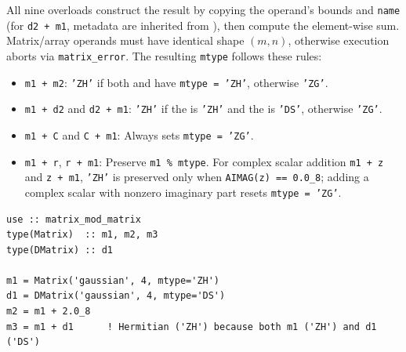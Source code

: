 All nine overloads construct the result by copying the  operand's bounds and \texttt{name} (for \texttt{d2 + m1}, metadata are inherited from ), then compute the element-wise sum. Matrix/array operands must have identical shape $(m, n)$, otherwise execution aborts via \texttt{matrix\_error}. The resulting \texttt{mtype} follows these rules:
\begin{itemize}
  \item \texttt{m1 + m2}: \texttt{'ZH'} if both  and  have \texttt{mtype = 'ZH'}, otherwise \texttt{'ZG'}.
  \item \texttt{m1 + d2} and \texttt{d2 + m1}: \texttt{'ZH'} if the  is \texttt{'ZH'} and the  is \texttt{'DS'}, otherwise \texttt{'ZG'}.
  \item \texttt{m1 + C} and \texttt{C + m1}: Always sets \texttt{mtype = 'ZG'}.
  \item \texttt{m1 + r}, \texttt{r + m1}: Preserve \texttt{m1 \% mtype}. For complex scalar addition \texttt{m1 + z} and \texttt{z + m1}, \texttt{'ZH'} is preserved only when \texttt{AIMAG(z) == 0.0\_8}; adding a complex scalar with nonzero imaginary part resets \texttt{mtype = 'ZG'}.
\end{itemize}

\begin{description}[leftmargin=2.2cm, style=nextline]
\end{description}

\lstset{language=[95]Fortran}
\begin{lstlisting}
use :: matrix_mod_matrix
type(Matrix)  :: m1, m2, m3
type(DMatrix) :: d1

m1 = Matrix('gaussian', 4, mtype='ZH')
d1 = DMatrix('gaussian', 4, mtype='DS')
m2 = m1 + 2.0_8
m3 = m1 + d1      ! Hermitian ('ZH') because both m1 ('ZH') and d1 ('DS')
\end{lstlisting}


